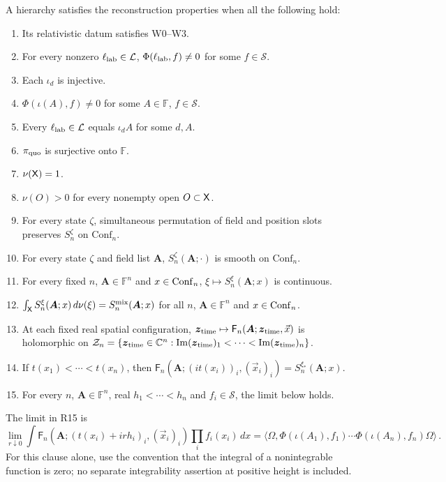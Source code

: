 \begin{definition}\label{def:reconstruction}
A hierarchy satisfies the reconstruction properties when all the following hold:

\begin{enumerate}[label=\textup{R\arabic*.},leftmargin=3em,nosep]
\item Its relativistic datum satisfies W0–W3.
\item For every nonzero $\ell_{\rm lab}\in\mathcal L$, $\Phi(\ell_{\rm lab},f)\ne0$ for some $f\in\mathcal S$.
\item Each $\iota_d$ is injective.
\item $\Phi(\iota(A),f)\ne0$ for some $A\in\mathbb F$, $f\in\mathcal S$.
\item Every $\ell_{\rm lab}\in\mathcal L$ equals $\iota_dA$ for some $d,A$.
\item $\pi_{\rm quo}$ is surjective onto $\mathbb F$.
\item $\nu(\mathsf{X})=1$.
\item $\nu(O)>0$ for every nonempty open $O\subset\mathsf{X}$.
\item For every state $\zeta$, simultaneous permutation of field and position slots preserves $S_n^\zeta$ on $\mathrm{Conf}_n$.
\item For every state $\zeta$ and field list $\boldsymbol A$, $S_n^\zeta(\boldsymbol A;\cdot)$ is smooth on $\mathrm{Conf}_n$.
\item For every fixed $n$, $\boldsymbol A\in\mathbb F^n$ and $x\in\mathrm{Conf}_{n}$, $\xi\mapsto S_n^\xi(\boldsymbol A;x)$ is continuous.
\item $\int_{\mathsf{X}} S_n^\xi(\boldsymbol A;x)\,d\nu(\xi)=S_n^{\mathrm{mix}}(\boldsymbol A;x)$ for all $n$, $\boldsymbol A\in\mathbb F^n$ and $x\in\mathrm{Conf}_{n}$.
\item At each fixed real spatial configuration, $\boldsymbol z_{\rm time}\mapsto\mathsf F_n(\boldsymbol A;\boldsymbol z_{\rm time},\vec x)$ is holomorphic on $\mathcal Z_n=\{\boldsymbol z_{\rm time}\in\mathbb{C}^n:\operatorname{Im}(\boldsymbol z_{\rm time})_1<\cdots<\operatorname{Im}(\boldsymbol z_{\rm time})_n\}$.
\item If $t(x_1)<\cdots<t(x_n)$, then $\mathsf F_n(\boldsymbol A;(it(x_i))_i,(\vec x_i)_i)=S_n^{\xi_*}(\boldsymbol A;x)$.
\item For every $n$, $\boldsymbol A\in\mathbb F^n$, real $h_1<\cdots<h_n$ and $f_i\in\mathcal S$, the limit below holds.
\end{enumerate}

The limit in R15 is
\begin{equation}\label{eq:reconstruction-boundary}
\lim_{r\downarrow0}\int\mathsf F_n(\boldsymbol A;(t(x_i)+irh_i)_i,(\vec x_i)_i)\prod_if_i(x_i)\,dx
=\langle\Omega,\Phi(\iota(A_1),f_1)\cdots\Phi(\iota(A_n),f_n)\Omega\rangle\,.
\end{equation}
For this clause alone, use the convention that the integral of a nonintegrable function is zero; no separate integrability assertion at positive height is included.
\end{definition}

